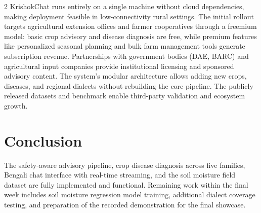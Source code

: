 \documentclass[10pt]{article}
\begin{document}
\begin{multicols}{2}
KrishokChat runs entirely on a single machine without cloud dependencies, making deployment feasible in low-connectivity rural settings. The initial rollout targets agricultural extension offices and farmer cooperatives through a freemium model: basic crop advisory and disease diagnosis are free, while premium features like personalized seasonal planning and bulk farm management tools generate subscription revenue. Partnerships with government bodies (DAE, BARC) and agricultural input companies provide institutional licensing and sponsored advisory content. The system's modular architecture allows adding new crops, diseases, and regional dialects without rebuilding the core pipeline. The publicly released datasets and benchmark enable third-party validation and ecosystem growth.


\section*{Conclusion}

The safety-aware advisory pipeline, crop disease diagnosis across five families, Bengali chat interface with real-time streaming, and the soil moisture field dataset are fully implemented and functional. Remaining work within the final week includes soil moisture regression model training, additional dialect coverage testing, and preparation of the recorded demonstration for the final showcase.

\end{multicols}
\end{document}
